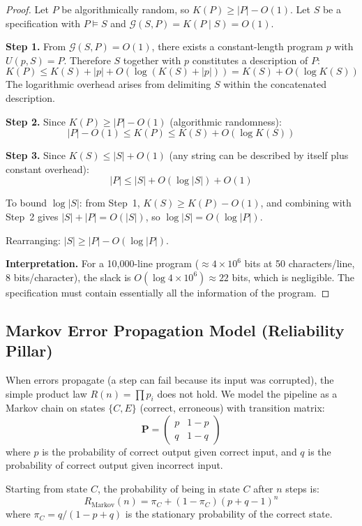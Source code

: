 \begin{proof}
Let $P$ be algorithmically random, so $K(P) \geq |P| - O(1)$.
Let $S$ be a specification with $P \models S$ and $\mathcal{G}(S, P) = K(P \mid S) = O(1)$.

\textbf{Step 1.} From $\mathcal{G}(S, P) = O(1)$, there exists a constant-length
program $p$ with $U(p, S) = P$. Therefore $S$ together with $p$ constitutes a
description of $P$:
\[
  K(P) \leq K(S) + |p| + O(\log(K(S) + |p|)) = K(S) + O(\log K(S))
\]
The logarithmic overhead arises from delimiting $S$ within the concatenated description.

\textbf{Step 2.} Since $K(P) \geq |P| - O(1)$ (algorithmic randomness):
\[
  |P| - O(1) \leq K(P) \leq K(S) + O(\log K(S))
\]

\textbf{Step 3.} Since $K(S) \leq |S| + O(1)$ (any string can be described by
itself plus constant overhead):
\[
  |P| \leq |S| + O(\log |S|) + O(1)
\]

To bound $\log |S|$: from Step~1, $K(S) \geq K(P) - O(1)$, and combining
with Step~2 gives $|S| + |P| = O(|S|)$, so $\log |S| = O(\log |P|)$.

Rearranging: $|S| \geq |P| - O(\log |P|)$.

\textbf{Interpretation.} For a 10,000-line program ($\approx 4 \times 10^6$ bits
at 50 characters/line, 8 bits/character), the slack is
$O(\log 4 \times 10^6) \approx 22$ bits, which is negligible.
The specification must contain essentially all the information of the program.
\end{proof}


\subsection{Markov Error Propagation Model (Reliability Pillar)}

When errors propagate (a step can fail because its input was corrupted),
the simple product law $R(n) = \prod p_i$ does not hold.
We model the pipeline as a Markov chain on states $\{C, E\}$ (correct, erroneous)
with transition matrix:
\[
  \mathbf{P} = \begin{pmatrix} p & 1 - p \\ q & 1 - q \end{pmatrix}
\]
where $p$ is the probability of correct output given correct input,
and $q$ is the probability of correct output given incorrect input.

\begin{theorem}
Starting from state $C$, the probability of being in state $C$ after $n$ steps is:
\[
  R_{\mathrm{Markov}}(n) = \pi_C + (1 - \pi_C)(p + q - 1)^n
\]
where $\pi_C = q / (1 - p + q)$ is the stationary probability of the correct state.
\end{theorem}

